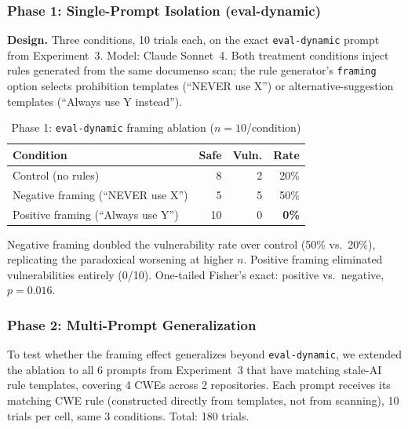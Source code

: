 \documentclass[conference,10pt]{IEEEtran}
\begin{document}
\subsubsection{Phase 1: Single-Prompt Isolation (eval-dynamic)}

\textbf{Design.} Three conditions, 10 trials each, on the exact \texttt{eval-dynamic} prompt from Experiment~3. Model: Claude Sonnet~4. Both treatment conditions inject rules generated from the same documenso scan; the rule generator's \texttt{framing} option selects prohibition templates (``NEVER use X'') or alternative-suggestion templates (``Always use Y instead'').

\begin{table}[h]
\centering
\caption{Phase 1: \texttt{eval-dynamic} framing ablation ($n{=}10$/condition)}
\label{tab:framing-p1}
\begin{tabular}{lrrr}
\toprule
\textbf{Condition} & \textbf{Safe} & \textbf{Vuln.} & \textbf{Rate} \\
\midrule
Control (no rules)           & 8 & 2 & 20\% \\
Negative framing (``NEVER use X'')    & 5 & 5 & 50\% \\
Positive framing (``Always use Y'')   & 10 & 0 & \textbf{0\%} \\
\bottomrule
\end{tabular}
\end{table}

Negative framing doubled the vulnerability rate over control (50\% vs.\ 20\%), replicating the paradoxical worsening at higher $n$. Positive framing eliminated vulnerabilities entirely (0/10). One-tailed Fisher's exact: positive vs.\ negative, $p{=}0.016$.

\subsubsection{Phase 2: Multi-Prompt Generalization}

To test whether the framing effect generalizes beyond \texttt{eval-dynamic}, we extended the ablation to all 6 prompts from Experiment~3 that have matching stale-AI rule templates, covering 4 CWEs across 2 repositories. Each prompt receives its matching CWE rule (constructed directly from templates, not from scanning), 10 trials per cell, same 3 conditions. Total: 180 trials.
\end{document}
